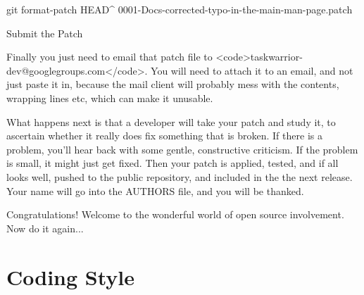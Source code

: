 \documentclass[t,handout]{beamer}
\begin{document}
git format-patch HEAD^
0001-Docs-corrected-typo-in-the-main-man-page.patch

Submit the Patch

Finally you just need to email that patch file to <code>taskwarrior-dev@googlegroups.com</code>. You will need to attach it to an email, and not just paste it in, because the mail client will probably mess with the contents, wrapping lines etc, which can make it unusable.

What happens next is that a developer will take your patch and study it, to ascertain whether it really does fix something that is broken. If there is a problem, you'll hear back with some gentle, constructive criticism. If the problem is small, it might just get fixed. Then your patch is applied, tested, and if all looks well, pushed to the public repository, and included in the the next release. Your name will go into the AUTHORS file, and you will be thanked.

Congratulations! Welcome to the wonderful world of open source involvement. Now do it again...

\fi

\section{Coding Style}

\end{document}
